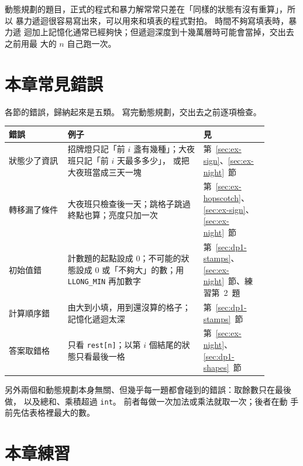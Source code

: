 \begin{apcsnote}
動態規劃的題目，正式的程式和暴力解常常只差在「同樣的狀態有沒有重算」，所以
暴力遞迴很容易寫出來，可以用來和填表的程式對拍。 時間不夠寫填表時，暴力遞
迴加上記憶化通常已經夠快；但遞迴深度到十幾萬層時可能會當掉，交出去之前用最
大的 $n$ 自己跑一次。
\end{apcsnote}

\section{本章常見錯誤}
\label{sec:dp1-pitfalls}

各節的錯誤，歸納起來是五類。 寫完動態規劃，交出去之前逐項檢查。

\begin{center}
\begin{tabular}{p{0.2\linewidth}p{0.46\linewidth}p{0.22\linewidth}}
\toprule
錯誤 & 例子 & 見 \\
\midrule
狀態少了資訊 & 招牌燈只記「前 $i$ 盞有幾種」；大夜班只記「前 $i$ 天最多多少」，
或把大夜班當成三天一塊 & 第~\ref{sec:ex-sign}、\ref{sec:ex-night}~節 \\
轉移漏了條件 & 大夜班只檢查後一天；跳格子跳過終點也算；亮度只加一次 &
第~\ref{sec:ex-hopscotch}、\ref{sec:ex-sign}、\ref{sec:ex-night}~節 \\
初始值錯 & 計數題的起點設成 $0$；不可能的狀態設成 $0$ 或「不夠大」的數；用
\texttt{LLONG\_MIN} 再加數字 & 第~\ref{sec:dp1-stamps}、\ref{sec:ex-night}~節、練習第~2~題 \\
計算順序錯 & 由大到小填，用到還沒算的格子；記憶化遞迴太深 &
第~\ref{sec:dp1-stamps}~節 \\
答案取錯格 & 只看 \texttt{rest[n]}；以第 $i$ 個結尾的狀態只看最後一格 &
第~\ref{sec:ex-night}、\ref{sec:dp1-shapes}~節 \\
\bottomrule
\end{tabular}
\end{center}

另外兩個和動態規劃本身無關、但幾乎每一題都會碰到的錯誤：取餘數只在最後做，
以及總和、乘積超過 \texttt{int}。 前者每做一次加法或乘法就取一次；後者在動
手前先估表格裡最大的數。

\section{本章練習}
\label{sec:dp1-exercises}

